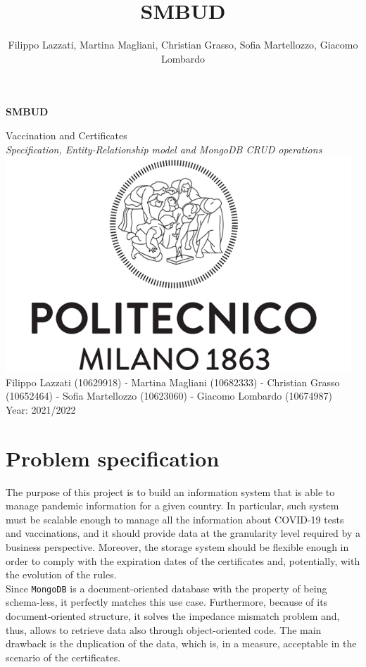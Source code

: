 \documentclass{article}
\title{SMBUD}
\author{Filippo Lazzati, Martina Magliani, Christian Grasso, Sofia Martellozzo, Giacomo Lombardo}
\begin{document}
\thispagestyle{empty}
\begin{titlepage}
    \begin{center}
       {\Huge \textbf{SMBUD}} %
       \vspace{0.5cm}
       \\
    \begin{LARGE}
        {Vaccination and Certificates}
        \vspace{1.0cm}
        \\
        {\textit{Specification, Entity-Relationship model and MongoDB CRUD operations}}
           \includegraphics[width=13cm]{logo/polimi.png}
          \vspace{1.5cm}\\
                  Filippo Lazzati (10629918) - Martina Magliani (10682333) - Christian Grasso (10652464) - Sofia Martellozzo (10623060) - Giacomo Lombardo (10674987)\\
       {Year: 2021/2022}
    \end{LARGE}  
   \end{center}
\end{titlepage}
\newpage
\tableofcontents %
\newpage
\section{Problem specification}
The purpose of this project is to build an information system that is able to manage pandemic information for a given country. In particular, such system must be scalable enough to manage all the information about COVID-19 tests and vaccinations, and it should provide data at the granularity level required by a business perspective. Moreover, the storage system should be flexible enough in order to comply with the expiration dates of the certificates and, potentially, with the evolution of the rules.\\
Since \verb|MongoDB| is a document-oriented database with the property of being schema-less, it perfectly matches this use case. Furthermore, because of its document-oriented structure, it solves the impedance mismatch problem and, thus, allows to retrieve data also through object-oriented code. The main drawback is the duplication of the data, which is, in a measure, acceptable in the scenario of the certificates.
\end{document}
